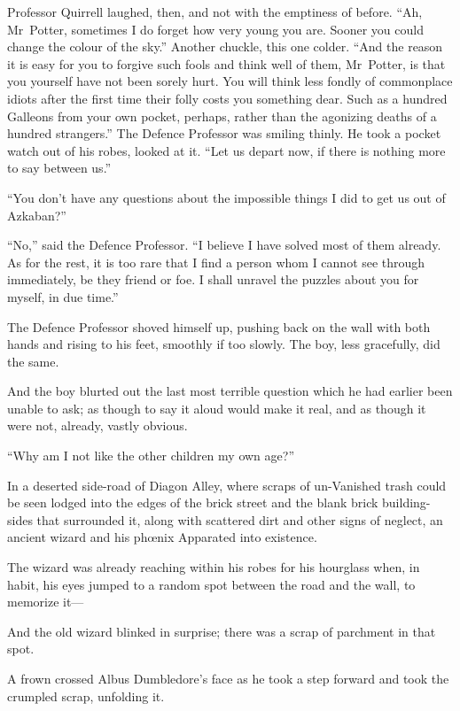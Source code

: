 Professor Quirrell laughed, then, and not with the emptiness of before.
“Ah, Mr~Potter, sometimes I do forget how very young you are. Sooner you could change the colour of the sky.” Another chuckle, this one colder.
“And the reason it is easy for you to forgive such fools and think well of them, Mr~Potter, is that you yourself have not been sorely hurt. You will think less fondly of commonplace idiots after the first time their folly costs you something dear. Such as a hundred Galleons from your own pocket, perhaps, rather than the agonizing deaths of a hundred strangers.” The Defence Professor was smiling thinly. He took a pocket watch out of his robes, looked at it.
“Let us depart now, if there is nothing more to say between us.”

“You don’t have any questions about the impossible things I did to get us out of Azkaban?”

“No,” said the Defence Professor.
“I believe I have solved most of them already. As for the rest, it is too rare that I find a person whom I cannot see through immediately, be they friend or foe. I shall unravel the puzzles about you for myself, in due time.”

The Defence Professor shoved himself up, pushing back on the wall with both hands and rising to his feet, smoothly if too slowly. The boy, less gracefully, did the same.

And the boy blurted out the last most terrible question which he had earlier been unable to ask; as though to say it aloud would make it real, and as though it were not, already, vastly obvious.

“Why am I not like the other children my own age?”

\later

In a deserted side-road of Diagon Alley, where scraps of un-Vanished trash could be seen lodged into the edges of the brick street and the blank brick building-sides that surrounded it, along with scattered dirt and other signs of neglect, an ancient wizard and his phœnix Apparated into existence.

The wizard was already reaching within his robes for his hourglass when, in habit, his eyes jumped to a random spot between the road and the wall, to memorize it—

And the old wizard blinked in surprise; there was a scrap of parchment in that spot.

A frown crossed Albus Dumbledore’s face as he took a step forward and took the crumpled scrap, unfolding it.

